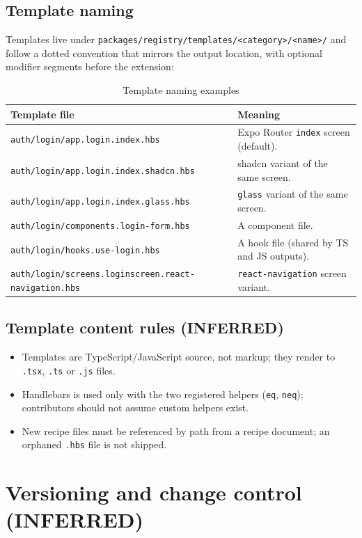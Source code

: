 \subsection*{Template naming}

Templates live under \texttt{packages/registry/templates/<category>/<name>/} and
follow a dotted convention that mirrors the output location, with optional
modifier segments before the extension:

\begin{longtable}{p{6cm}p{8.2cm}}
\caption{Template naming examples}\\
\toprule
\textbf{Template file} & \textbf{Meaning} \\
\midrule

\texttt{auth/login/app.login.index.hbs} & Expo Router \texttt{index} screen
(default). \\
\texttt{auth/login/app.login.index.shadcn.hbs} & shadcn variant of the same
screen. \\
\texttt{auth/login/app.login.index.glass.hbs} & \texttt{glass} variant of the same
screen. \\
\texttt{auth/login/components.login-form.hbs} & A component file. \\
\texttt{auth/login/hooks.use-login.hbs} & A hook file (shared by TS and JS
outputs). \\
\texttt{auth/login/screens.loginscreen.react-navigation.hbs} &
\texttt{react-navigation} screen variant. \\
\bottomrule
\end{longtable}

\subsection*{Template content rules (INFERRED)}

\begin{itemize}
  \item Templates are TypeScript/JavaScript source, not markup; they render to
        \texttt{.tsx}, \texttt{.ts} or \texttt{.js} files.
  \item Handlebars is used only with the two registered helpers
        (\texttt{eq}, \texttt{neq}); contributors should not assume custom helpers
        exist.
  \item New recipe files must be referenced by path from a recipe document;
        an orphaned \texttt{.hbs} file is not shipped.
\end{itemize}

\section{Versioning and change control (INFERRED)}

